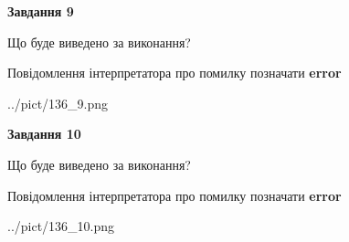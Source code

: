 \documentclass[12pt, ukrainian]{article}
\begin{document}
{{\begin {center}\textbf{Завдання 9}\end {center}}\par
Що буде виведено за виконання? \par
Повідомлення інтерпретатора про помилку позначати \textbf{error}

\begin{center}
	{../pict/136_9.png}
\end{center}
\newpage

{\begin {center}\textbf{Завдання 10}\end {center}}\par
Що буде виведено за виконання? \par
Повідомлення інтерпретатора про помилку позначати \textbf{error}

\begin{center}
	{../pict/136_10.png}
\end{center}
\newpage

}
\end{document}
